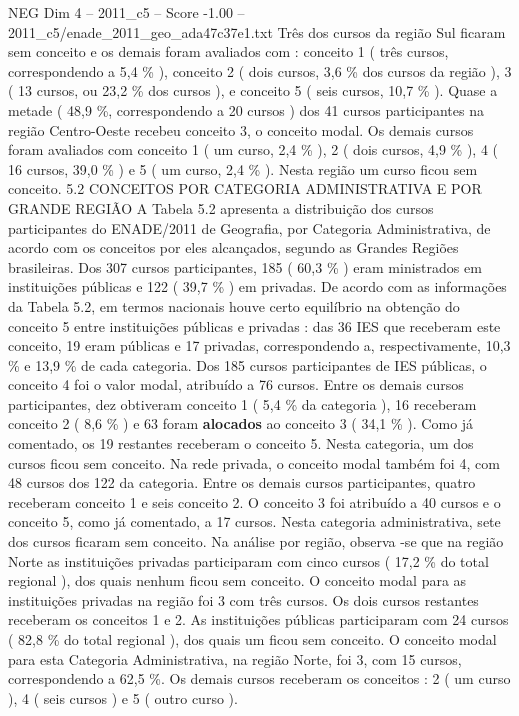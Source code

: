 \begin{textsample}{NEG Dim 4 – 2011\_c5 – Score -1.00 – 2011\_c5/enade\_2011\_geo\_ada47c37e1.txt}
Três dos cursos da região Sul ficaram sem conceito e os demais foram avaliados com : conceito 1 ( três cursos, correspondendo a 5,4 \% ), conceito 2 ( dois cursos, 3,6 \% dos cursos da região ), 3 ( 13 cursos, ou 23,2 \% dos cursos ), e conceito 5 ( seis cursos, 10,7 \% ).
Quase a metade ( 48,9 \%, correspondendo a 20 cursos ) dos 41 cursos participantes na região Centro-Oeste recebeu conceito 3, o conceito modal.
Os demais cursos foram avaliados com conceito 1 ( um curso, 2,4 \% ), 2 ( dois cursos, 4,9 \% ), 4 ( 16 cursos, 39,0 \% ) e 5 ( um curso, 2,4 \% ).
Nesta região um curso ficou sem conceito. 5.2 CONCEITOS POR CATEGORIA ADMINISTRATIVA E POR GRANDE REGIÃO A Tabela 5.2 apresenta a distribuição dos cursos participantes do ENADE/2011 de Geografia, por Categoria Administrativa, de acordo com os conceitos por eles alcançados, segundo as Grandes Regiões brasileiras.
Dos 307 cursos participantes, 185 ( 60,3 \% ) eram ministrados em instituições públicas e 122 ( 39,7 \% ) em privadas.
De acordo com as informações da Tabela 5.2, em termos nacionais houve certo equilíbrio na obtenção do conceito 5 entre instituições públicas e privadas : das 36 IES que receberam este conceito, 19 eram públicas e 17 privadas, correspondendo a, respectivamente, 10,3 \% e 13,9 \% de cada categoria.
Dos 185 cursos participantes de IES públicas, o conceito 4 foi o valor modal, atribuído a 76 cursos.
Entre os demais cursos participantes, dez obtiveram conceito 1 ( 5,4 \% da categoria ), 16 receberam conceito 2 ( 8,6 \% ) e 63 foram \textbf{alocados} ao conceito 3 ( 34,1 \% ).
Como já comentado, os 19 restantes receberam o conceito 5.
Nesta categoria, um dos cursos ficou sem conceito.
Na rede privada, o conceito modal também foi 4, com 48 cursos dos 122 da categoria.
Entre os demais cursos participantes, quatro receberam conceito 1 e seis conceito 2.
O conceito 3 foi atribuído a 40 cursos e o conceito 5, como já comentado, a 17 cursos.
Nesta categoria administrativa, sete dos cursos ficaram sem conceito.
Na análise por região, observa -se que na região Norte as instituições privadas participaram com cinco cursos ( 17,2 \% do total regional ), dos quais nenhum ficou sem conceito.
O conceito modal para as instituições privadas na região foi 3 com três cursos.
Os dois cursos restantes receberam os conceitos 1 e 2.
As instituições públicas participaram com 24 cursos ( 82,8 \% do total regional ), dos quais um ficou sem conceito.
O conceito modal para esta Categoria Administrativa, na região Norte, foi 3, com 15 cursos, correspondendo a 62,5 \%.
Os demais cursos receberam os conceitos : 2 ( um curso ), 4 ( seis cursos ) e 5 ( outro curso ).

\end{textsample}
